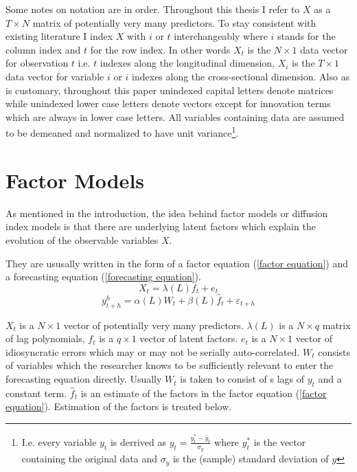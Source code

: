 \documentclass[12pt]{article}
\begin{document}
Some notes on notation are in order. Throughout this thesis I refer to $X$ as a $T \times N$ matrix of potentially very many predictors. To stay consistent with existing literature I index $X$ with $i$ or $t$ interchangeably where $i$ stands for the column index and $t$ for the row index. In other words $X_t$ is the $N \times 1$ data vector for observation $t$ i.e. $t$ indexes along the longitudinal dimension, $X_i$ is the $T \times 1$ data vector for variable $i$ or $i$ indexes along the cross-sectional dimension. Also as is customary, throughout this paper unindexed capital letters denote matrices while unindexed lower case letters denote vectors except for innovation terms which are always in lower case letters. All variables containing data are assumed to be demeaned and normalized to have unit variance\footnote{I.e. every variable $y_t$ is derrived as $y_t = \frac{y_t^* - \bar y_t}{\sigma_{y}}$ where $y_t^*$ is the vector containing the original data and $\sigma_{y}$ is the (sample) standard deviation of $y$}.

\section{Factor Models}
As mentioned in the introduction, the idea behind factor models or diffusion index models is that there are underlying latent factors which explain the evolution of the observable variables $X$. 

They are ususally written in the form of a factor equation (\ref{factor equation}) and a forecasting equation (\ref{forecasting equation}).
\begin{equation}
	\label{factor equation}
	X_t = \lambda(L) f_t + e_t
\end{equation}
\begin{equation}
	\label{forecasting equation}
	y^h_{t+h} = \alpha(L) W_t + \beta(L) \hat f_t + \varepsilon_{t+h}
\end{equation}
	
$X_t$ is a $N \times 1$ vector of potentially very many predictors. $\lambda(L)$ is a $N \times q$ matrix of lag polynomials, $f_t$ is a $q \times 1$ vector of latent factors. $e_t$ is a $N \times 1$ vector of idiosyncratic errors which may or may not be serially auto-correlated. $W_t$ consists of variables which the researcher knows to be sufficiently relevant to enter the forecasting equation directly. Usually $W_t$ is taken to consist of s lags of $y_t$ and a constant term. $\hat f_t$ is an estimate of the factors in the factor equation (\ref{factor equation}). Estimation of the factors is treated below.
\end{document}
